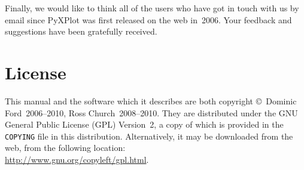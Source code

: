 Finally, we would like to think all of the users who have got in touch with us
by email since PyXPlot was first released on the web in~2006. Your feedback and
suggestions have been gratefully received.

\section{License}

This manual and the software which it describes are both copyright \copyright\
Dominic Ford~2006--2010, Ross Church~2008--2010. They are distributed under the
GNU General Public License (GPL) Version~2, a copy of which is provided in the
{\tt COPYING} file in this distribution. Alternatively, it may be downloaded from the web, from
the following location:\\ \url{http://www.gnu.org/copyleft/gpl.html}.

